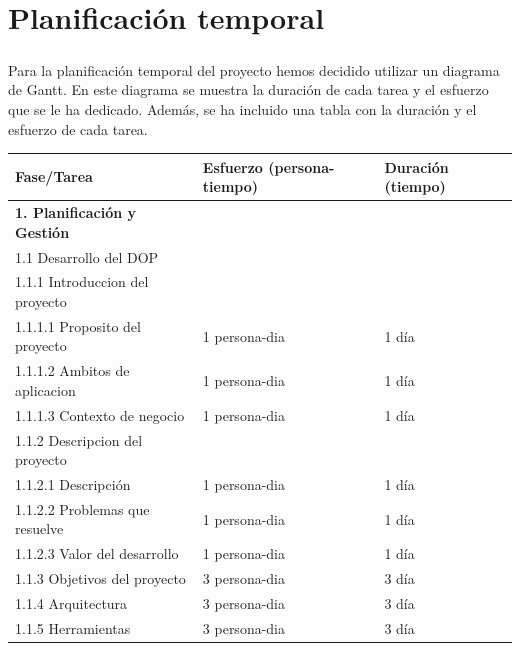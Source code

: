 \documentclass{report}
\begin{document}
    \chapter{Planificación temporal}
        \paragraph*{}{
            Para la planificación temporal del proyecto hemos decidido utilizar un diagrama de Gantt. En este diagrama se muestra la duración de cada tarea y el esfuerzo que se le ha dedicado. Además, se ha incluido una tabla con la duración y el esfuerzo de cada tarea.
        }
        \begin{center}
            \begin{longtable}{|p{7cm}|p{3cm}|p{3cm}|}
                \hline
                \textbf{Fase/Tarea} & \textbf{Esfuerzo (persona-tiempo)} & \textbf{Duración (tiempo)}\\
                \hline
                \hline
                \textbf{1. Planificación y Gestión} &  &  \\
                \hline
                1.1 Desarrollo del DOP &  & \\
                \hline
                1.1.1 Introduccion del proyecto &  & \\
                \hline
                1.1.1.1 Proposito del proyecto & 1 persona-dia & 1 día\\
                \hline
                1.1.1.2 Ambitos de aplicacion & 1 persona-dia & 1 día\\
                \hline
                1.1.1.3 Contexto de negocio & 1 persona-dia & 1 día\\
                \hline
                1.1.2 Descripcion del proyecto &  & \\
                \hline
                1.1.2.1 Descripción & 1 persona-dia & 1 día\\
                \hline
                1.1.2.2 Problemas que resuelve & 1 persona-dia & 1 día\\
                \hline
                1.1.2.3 Valor del desarrollo & 1 persona-dia & 1 día\\
                \hline
                1.1.3 Objetivos del proyecto & 3 persona-dia & 3 día\\
                \hline
                1.1.4 Arquitectura & 3 persona-dia & 3 día\\
                \hline
                1.1.5 Herramientas & 3 persona-dia & 3 día\\

\end{longtable}
\end{center}
\end{document}
